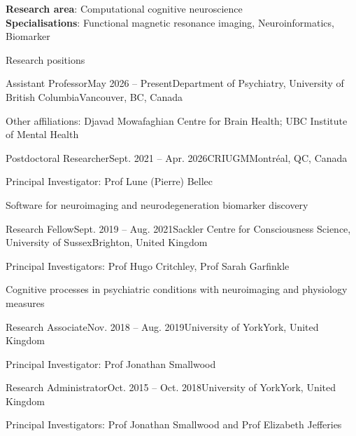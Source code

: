 \documentclass{resume} %
\begin{document}

\textbf{Research area}: 
Computational cognitive neuroscience \\ 
\textbf{Specialisations}: 
Functional magnetic resonance imaging, 
Neuroinformatics,
Biomarker




\begin{rSection}{Research positions}
  \begin{rSubsection}{Assistant Professor}{May 2026 -- Present}{Department of Psychiatry, University of British Columbia}{Vancouver, BC, Canada}
  \item Other affiliations: Djavad Mowafaghian Centre for Brain Health; UBC Institute of Mental Health
  \end{rSubsection}
  
  \begin{rSubsection}{Postdoctoral Researcher}{Sept. 2021 -- Apr. 2026}{CRIUGM}{Montr\'eal, QC, Canada}
    \item Principal Investigator: Prof Lune (Pierre) Bellec
    \item Software for neuroimaging and neurodegeneration biomarker discovery
  \end{rSubsection}

  \begin{rSubsection}{Research Fellow}{Sept. 2019 -- Aug. 2021}{Sackler Centre for Consciousness Science, University of Sussex}{Brighton, United Kingdom}
    \item Principal Investigators: Prof Hugo Critchley, Prof Sarah Garfinkle
    \item Cognitive processes in psychiatric conditions with neuroimaging and physiology measures
  \end{rSubsection}

  \begin{rSubsection}{Research Associate}{Nov. 2018 -- Aug. 2019}{University of York}{York, United Kingdom}
  \item Principal Investigator: Prof Jonathan Smallwood
  \end{rSubsection}

  \begin{rSubsection}{Research Administrator}{Oct. 2015 -- Oct. 2018}{University of York}{York, United Kingdom}
    \item Principal Investigators: Prof Jonathan Smallwood and Prof Elizabeth Jefferies
  \end{rSubsection}

  \end{rSection}
\end{document}

